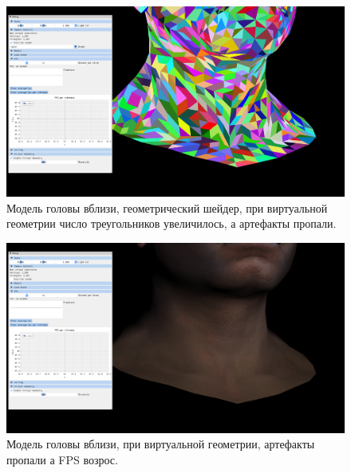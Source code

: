 \begin{figure}[H]
	\begin{center}
		\includegraphics[scale=0.3]{img/vgeom_view_good.png}
	\end{center}
	\captionsetup{justification=centering}
	\caption{Модель головы вблизи, геометрический шейдер, при виртуальной геометрии число треугольников увеличилось, а артефакты пропали. } 
	\label{img:vgeom_model_good}
\end{figure}

\begin{figure}[H]
	\begin{center}
		\includegraphics[scale=0.3]{img/vgeom_original_model.png}
	\end{center}
	\captionsetup{justification=centering}
	\caption{Модель головы вблизи, при виртуальной геометрии, артефакты пропали а FPS возрос. } 
	\label{img:vgeom_model_good_original_shader}
\end{figure}


